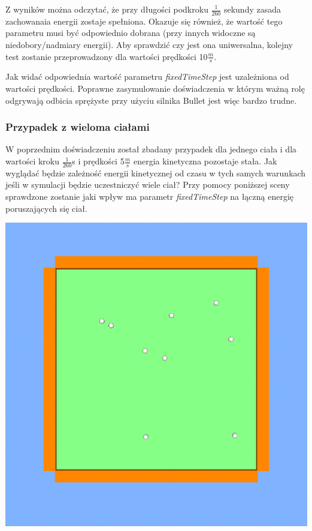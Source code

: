 Z wyników można odczytać, że przy długości podkroku $ \frac{1}{260} $ sekundy
zasada zachowanaia energii zostaje spełniona. Okazuje się również, że wartość
tego parametru musi być odpowiednio dobrana (przy innych widoczne są
niedobory/nadmiary energii). Aby sprawdzić czy jest ona uniwersalna, kolejny
test zostanie przeprowadzony dla wartości prędkości 10$\frac{m}{s}$.



Jak widać odpowiednia wartość parametru \emph{fixedTimeStep} jest uzależniona od
wartości prędkości. Poprawne zasymulowanie doświadczenia w którym ważną rolę
odgrywają odbicia sprężyste przy użyciu silnika Bullet jest więc bardzo trudne.

\subsubsection{Przypadek z wieloma ciałami}

W poprzednim doświadczeniu został zbadany przypadek dla jednego ciała i dla
wartości kroku $ \frac{1}{260} $s i prędkości 5$ \frac{m}{s} $ energia
kinetyczna pozostaje stała. Jak wyglądać będzie zależność energii kinetycznej od
czasu w tych samych warunkach jeśli w symulacji będzie uczestniczyć wiele ciał?
Przy pomocy poniższej sceny sprawdzone zostanie jaki wpływ ma parametr
\emph{fixedTimeStep} na łączną energię poruszających się ciał.

\begin{center}
\includegraphics[scale = 0.5]{./img/shot_2.png}
\end{center}

